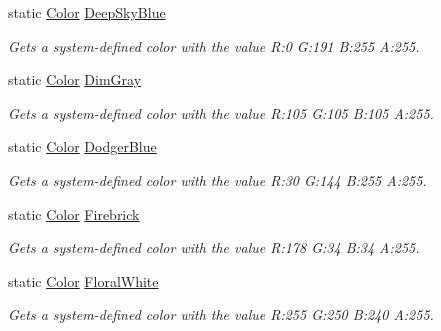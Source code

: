 \begin{DoxyCompactItemize}
static \hyperlink{struct_microsoft_1_1_xna_1_1_framework_1_1_color}{Color} \hyperlink{struct_microsoft_1_1_xna_1_1_framework_1_1_color_a0bd322982dd68141a8a887faf8e19343}{Deep\+Sky\+Blue}
\begin{DoxyCompactList}\small\item\em Gets a system-\/defined color with the value R\+:0 G\+:191 B\+:255 A\+:255.\end{DoxyCompactList}\item 
static \hyperlink{struct_microsoft_1_1_xna_1_1_framework_1_1_color}{Color} \hyperlink{struct_microsoft_1_1_xna_1_1_framework_1_1_color_a73a98119a20d7c65c90c5f66351c8d7f}{Dim\+Gray}
\begin{DoxyCompactList}\small\item\em Gets a system-\/defined color with the value R\+:105 G\+:105 B\+:105 A\+:255.\end{DoxyCompactList}\item 
static \hyperlink{struct_microsoft_1_1_xna_1_1_framework_1_1_color}{Color} \hyperlink{struct_microsoft_1_1_xna_1_1_framework_1_1_color_a32fea70c561566cb8e68344341d210f5}{Dodger\+Blue}
\begin{DoxyCompactList}\small\item\em Gets a system-\/defined color with the value R\+:30 G\+:144 B\+:255 A\+:255.\end{DoxyCompactList}\item 
static \hyperlink{struct_microsoft_1_1_xna_1_1_framework_1_1_color}{Color} \hyperlink{struct_microsoft_1_1_xna_1_1_framework_1_1_color_ac2c55f15f6ea0fbf278ba0bb93ada95f}{Firebrick}
\begin{DoxyCompactList}\small\item\em Gets a system-\/defined color with the value R\+:178 G\+:34 B\+:34 A\+:255.\end{DoxyCompactList}\item 
static \hyperlink{struct_microsoft_1_1_xna_1_1_framework_1_1_color}{Color} \hyperlink{struct_microsoft_1_1_xna_1_1_framework_1_1_color_adb5a8e3b19987f0ac953518f76bc19cc}{Floral\+White}
\begin{DoxyCompactList}\small\item\em Gets a system-\/defined color with the value R\+:255 G\+:250 B\+:240 A\+:255.\end{DoxyCompactList}\item 

\end{DoxyCompactItemize}

